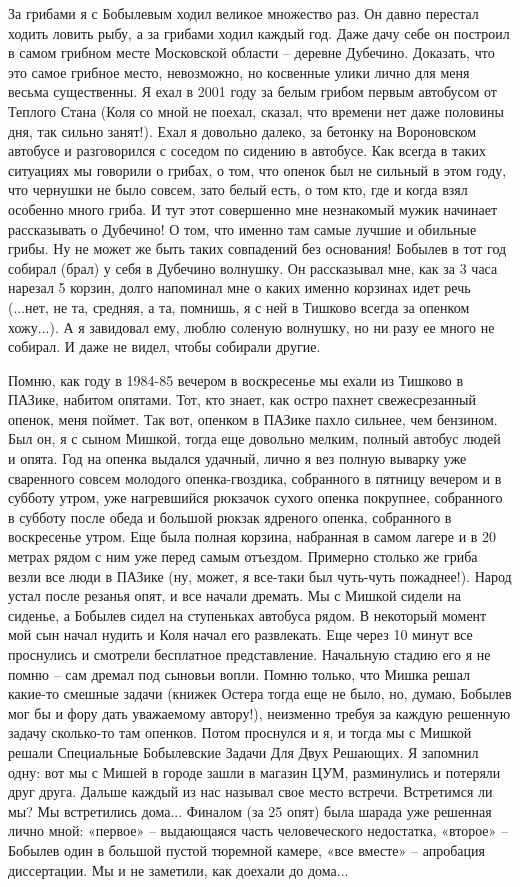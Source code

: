 За грибами я с Бобылевым ходил великое множество раз. Он давно перестал ходить ловить рыбу, а за грибами ходил каждый год. Даже дачу себе он построил в самом грибном месте Московской области – деревне Дубечино. Доказать, что это самое грибное место, невозможно, но косвенные улики лично для меня весьма существенны. Я ехал в 2001 году за белым грибом первым автобусом от Теплого Стана (Коля со мной не поехал, сказал, что времени нет даже половины дня, так сильно занят!). Ехал я довольно далеко, за бетонку на Вороновском автобусе и разговорился с соседом по сидению в автобусе. Как всегда в таких ситуациях мы говорили о грибах, о том, что опенок был не сильный в этом году, что чернушки не было совсем, зато белый есть, о том кто, где и когда взял особенно много гриба. И тут этот совершенно мне незнакомый мужик начинает рассказывать о Дубечино! О том, что именно там самые лучшие и обильные грибы. Ну не может же быть таких совпадений без основания! Бобылев в тот год собирал (брал) у себя в Дубечино волнушку. Он рассказывал мне, как за 3 часа нарезал 5 корзин, долго напоминал мне о каких именно корзинах идет речь (...нет, не та, средняя, а та, помнишь, я с ней в Тишково всегда за опенком хожу...). А я завидовал ему, люблю соленую волнушку, но ни разу ее много не собирал. И даже не видел, чтобы собирали другие.

Помню, как году в 1984-85 вечером в воскресенье мы ехали из Тишково в ПАЗике, набитом опятами. Тот, кто знает, как остро пахнет свежесрезанный опенок, меня поймет. Так вот, опенком в ПАЗике пахло сильнее, чем бензином. Был он, я с сыном Мишкой, тогда еще довольно мелким, полный автобус людей и опята. Год на опенка выдался удачный, лично я вез полную выварку уже сваренного совсем молодого опенка-гвоздика, собранного в пятницу вечером и в субботу утром, уже нагревшийся рюкзачок сухого опенка покрупнее, собранного в субботу после обеда и большой рюкзак ядреного опенка, собранного в воскресенье утром. Еще была полная корзина, набранная в самом лагере и в 20 метрах рядом с ним уже перед самым отъездом. Примерно столько же гриба везли все люди в ПАЗике (ну, может, я все-таки был чуть-чуть пожаднее!). Народ устал после резанья опят, и все начали дремать. Мы с Мишкой сидели на сиденье, а Бобылев сидел на ступеньках автобуса рядом. В некоторый момент мой сын начал нудить и Коля начал его развлекать. Еще через 10 минут все проснулись и смотрели бесплатное представление. Начальную стадию его я не помню – сам дремал под сыновьи вопли. Помню только, что Мишка решал какие-то смешные задачи (книжек Остера тогда еще не было, но, думаю, Бобылев мог бы и фору дать уважаемому автору!), неизменно требуя за каждую решенную задачу сколько-то там опенков. Потом  проснулся и я, и тогда мы с Мишкой решали Специальные Бобылевские Задачи Для Двух Решающих. Я запомнил одну: вот мы с Мишей в городе зашли в магазин ЦУМ, разминулись и потеряли друг друга. Дальше каждый из нас называл свое место встречи. Встретимся ли мы? Мы встретились дома... Финалом (за 25 опят) была шарада уже решенная лично мной: «первое» – выдающаяся часть человеческого недостатка, «второе» – Бобылев один в большой пустой тюремной камере, «все вместе» – апробация диссертации. Мы и не заметили, как доехали до дома...

